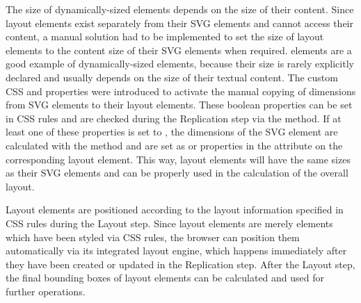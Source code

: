 The size of dynamically-sized elements depends on the size of their
content. Since layout elements exist separately from their SVG
elements and cannot access their content, a manual solution had to be
implemented to set the size of layout elements to the content size of
their SVG elements when required.  elements are a good
example of dynamically-sized elements, because their size is rarely
explicitly declared and usually depends on the size of their textual
content. The custom CSS  and
 properties were introduced to activate the
manual copying of dimensions from SVG elements to their layout
elements. These boolean properties can be set in CSS rules and are
checked during the Replication step via the
 method. If at least one of these
properties is set to , the dimensions of the SVG element
are calculated with the  method
and are set as  or  properties in the
 attribute on the corresponding layout element. This
way, layout elements will have the same sizes as their SVG elements
and can be properly used in the calculation of the overall layout.

Layout elements are positioned according to the layout information
specified in CSS rules during the Layout step. Since layout elements
are merely  elements which have been styled via CSS rules,
the browser can position them automatically via its integrated layout
engine, which happens immediately after they have been created or
updated in the Replication step. After the Layout step, the final
bounding boxes of layout elements can be calculated and used for
further operations.

